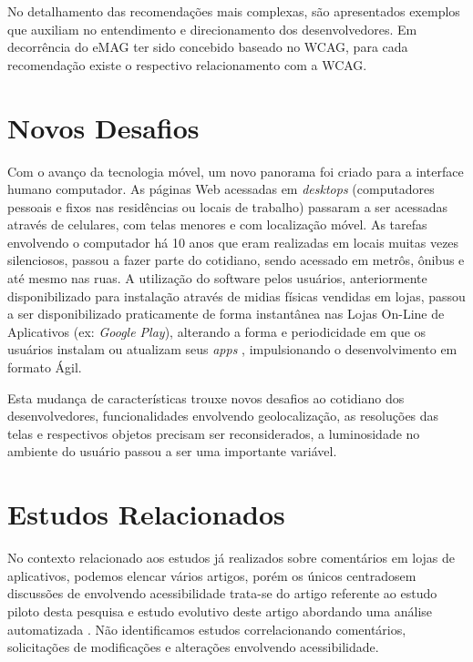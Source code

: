 No detalhamento das recomendações mais complexas, são apresentados exemplos que auxiliam no entendimento e direcionamento dos desenvolvedores. Em decorrência do eMAG ter sido concebido baseado no WCAG, para cada recomendação existe o respectivo relacionamento com a WCAG.


 
\section{Novos Desafios}
Com o avanço da tecnologia móvel, um novo panorama foi criado para a interface humano computador. As páginas Web acessadas em \textit{desktops} (computadores pessoais e fixos nas residências ou locais de trabalho) passaram a ser acessadas através de celulares, com telas menores e com localização móvel. As tarefas envolvendo o computador há 10 anos que eram realizadas em locais muitas vezes silenciosos, passou a fazer parte do cotidiano, sendo acessado em metrôs, ônibus e até mesmo nas ruas. A utilização do software pelos usuários, anteriormente disponibilizado para instalação através de midias físicas vendidas em lojas, passou a ser disponibilizado praticamente de forma instantânea nas Lojas On-Line de Aplicativos (ex: \textit{Google Play}), alterando a forma e periodicidade em que os usuários instalam ou atualizam seus \textit{apps} \cite{nayebi}, impulsionando o desenvolvimento em formato Ágil.

Esta mudança de características trouxe novos desafios ao cotidiano dos desenvolvedores, funcionalidades envolvendo geolocalização, as resoluções das telas e respectivos objetos precisam ser reconsiderados, a luminosidade no ambiente do usuário passou a ser uma importante variável.

\section{Estudos Relacionados}
No contexto relacionado aos estudos já realizados sobre comentários em lojas de aplicativos, podemos elencar vários artigos, porém os únicos centradosem discussões de envolvendo acessibilidade trata-se do artigo referente ao estudo piloto desta pesquisa \cite{ihc2019} e estudo evolutivo deste artigo abordando uma análise automatizada \cite{rochestertamjeed}. Não identificamos estudos correlacionando comentários, solicitações de modificações e alterações envolvendo acessibilidade.

